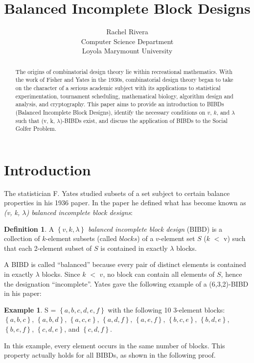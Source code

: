 \documentclass[12pt]{article}
\theoremstyle{definition}
\newtheorem{mydef}{Definition}
\newtheorem{ex}[thm]{Example}
\begin{document}
\nocite{*}

\title{Balanced Incomplete Block Designs}

\author{Rachel Rivera\\ 
Computer Science Department \\
Loyola Marymount University \\
}

\maketitle

\begin{abstract}
  The origins of combinatorial design theory lie within recreational mathematics. With the work of Fisher and Yates in the 1930s, combinatorial design theory began to take on the character of a serious academic subject with its applications to statistical experimentation, tournament scheduling, mathematical biology, algorithm design and analysis, and cryptography.\cite{Stinson:2008:CDC:1466390.1466393} This paper aims to provide an introduction to BIBDs (Balanced Incomplete Block Designs), identify the necessary conditions on $v$, $k$, and $\lambda$ such that (v, k, $\lambda$)-BIBDs exist, and discuss the application of BIBDs to the Social Golfer Problem.
\end{abstract}


\section{Introduction}
The statistician F. Yates studied subsets of a set subject to certain balance properties in his 1936 paper. \cite{Yates} In the paper he defined what has become known as \textit{(v, k, $\lambda$) balanced incomplete block designs}: 
\begin{mydef}\label{bibd}
  A \textit{$\left\{v, k, \lambda \right\}$ balanced incomplete block design} (BIBD) is a collection of $k$-element 
  subsets (called $blocks$) of a $v$-element set $S$ ($k$ $<$ v) such that each 2-element 
  subset of $S$ is contained in exactly $\lambda$ blocks.\cite{Yates}
\end{mydef}
A BIBD is called ``balanced'' because every pair of distinct elements is contained in exactly $\lambda$ blocks. Since $k$ $<$ $v$, no block can contain all elements of $S$, hence the designation ``incomplete''. Yates gave the following example of a (6,3,2)-BIBD in his paper: 
\begin{ex}
  S = $\left\{a, b, c, d, e, f\right\}$ with the following 10 3-element blocks:  
$\left\{a, b, c\right\}$, $\left\{a, b, d\right\}$, $\left\{a, c, e\right\}$, $\left\{a, d, f\right\}$, $\left\{a, e, f\right\}$, $\left\{b, c, e\right\}$, $\left\{b, d, e\right\}$, $\left\{b, e, f\right\}$, $\left\{c, d, e\right\}$, and $\left\{c, d, f\right\}$. 
\end{ex}
In this example, every element occurs in the same number of blocks. This property actually holds for all BIBDs, as shown in the following proof. \cite{Colbourn} 
\end{document}
